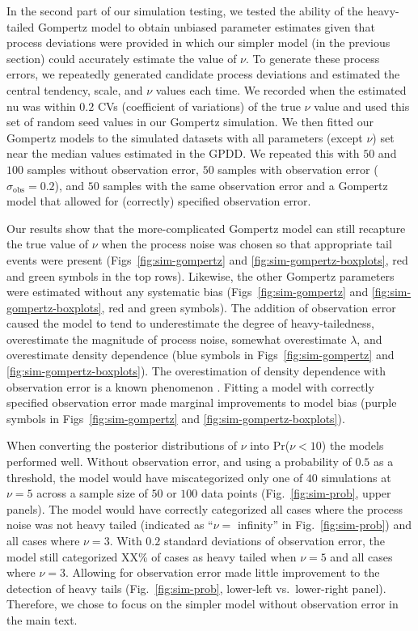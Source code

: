 In the second part of our simulation testing, we tested the ability of the heavy-tailed Gompertz model to obtain unbiased parameter estimates given that process deviations were provided in which our simpler model (in the previous section) could accurately estimate the value of $\nu$. To generate these process errors, we repeatedly generated candidate process deviations and estimated the central tendency, scale, and $\nu$ values each time. We recorded when the estimated nu was within $0.2$ CVs (coefficient of variations) of the true $\nu$ value and used this set of random seed values in our Gompertz simulation. We then fitted our Gompertz models to the simulated datasets with all parameters (except $\nu$) set near the median values estimated in the GPDD. We repeated this with $50$ and $100$ samples without observation error, $50$ samples with observation error ($\sigma_\mathrm{obs} = 0.2$), and $50$ samples with the same observation error and a Gompertz model that allowed for (correctly) specified observation error.

Our results show that the more-complicated Gompertz model can still recapture the true value of $\nu$ when the process noise was chosen so that appropriate tail events were present (Figs~\ref{fig:sim-gompertz} and \ref{fig:sim-gompertz-boxplots}, red and green symbols in the top rows). Likewise, the other Gompertz parameters were estimated without any systematic bias (Figs~\ref{fig:sim-gompertz} and \ref{fig:sim-gompertz-boxplots}, red and green symbols). The addition of observation error caused the model to tend to underestimate the degree of heavy-tailedness, overestimate the magnitude of process noise, somewhat overestimate $\lambda$, and overestimate density dependence (blue symbols in Figs~\ref{fig:sim-gompertz} and \ref{fig:sim-gompertz-boxplots}). The overestimation of density dependence with observation error is a known phenomenon \citep{knape2012}. Fitting a model with correctly specified observation error made marginal improvements to model bias (purple symbols in Figs~\ref{fig:sim-gompertz} and \ref{fig:sim-gompertz-boxplots}). 

When converting the posterior distributions of $\nu$ into Pr($\nu < 10$) the models performed well. Without observation error, and using a probability of $0.5$ as a threshold, the model would have miscategorized only one of $40$ simulations at $\nu = 5$ across a sample size of $50$ or $100$ data points (Fig.~\ref{fig:sim-prob}, upper panels). The model would have correctly categorized all cases where the process noise was not heavy tailed (indicated as ``$\nu =$ infinity'' in Fig.~\ref{fig:sim-prob}) and all cases where $\nu = 3$. With $0.2$ standard deviations of observation error, the model still categorized XX\% of cases as heavy tailed when $\nu = 5$ and all cases where $\nu = 3$. Allowing for observation error made little improvement to the detection of heavy tails (Fig.~\ref{fig:sim-prob}, lower-left vs.\ lower-right panel). Therefore, we chose to focus on the simpler model without observation error in the main text.

